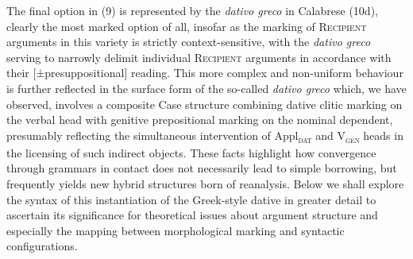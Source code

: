 \documentclass[output=paper,modfonts,nonflat]{langsci/langscibook}
\begin{document}
\begin{styleStandard}
\end{styleStandard}

\begin{styleTextbody}
The final option in (9) is represented by the \textit{dativo greco }in Calabrese\textit{ }(10d), clearly the most marked option of all, insofar as the marking of \textsc{Recipient} arguments in this variety is strictly context-sensitive, with the \textit{dativo greco }serving to narrowly delimit individual \textsc{Recipient} arguments in accordance with their [±presuppositional] reading. This more complex and non-uniform behaviour is further reflected in the surface form of the so-called \textit{dativo greco} which, we have observed, involves a composite Case structure combining dative clitic marking on the verbal head with genitive prepositional marking on the nominal dependent, presumably reflecting the simultaneous intervention of Appl\textsc{\textsubscript{dat}} and V\textsc{\textsubscript{gen}} heads in the licensing of such indirect objects. These facts highlight how convergence through grammars in contact does not necessarily lead to simple borrowing, but frequently yields new hybrid structures born of reanalysis. Below we shall explore the syntax of this instantiation of the Greek-style dative in greater detail to ascertain its significance for theoretical issues about argument structure and especially the mapping between morphological marking and syntactic configurations.
\end{styleTextbody}
\end{document}

